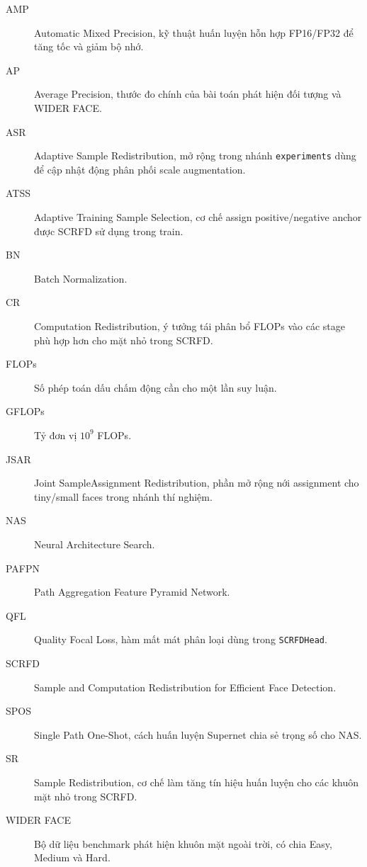 ﻿\begin{description}
  \item[AMP] Automatic Mixed Precision, kỹ thuật huấn luyện hỗn hợp FP16/FP32 để tăng tốc và giảm bộ nhớ.
  \item[AP] Average Precision, thước đo chính của bài toán phát hiện đối tượng và WIDER FACE.
  \item[ASR] Adaptive Sample Redistribution, mở rộng trong nhánh \texttt{experiments} dùng để cập nhật động phân phối scale augmentation.
  \item[ATSS] Adaptive Training Sample Selection, cơ chế assign positive/negative anchor được SCRFD sử dụng trong train.
  \item[BN] Batch Normalization.
  \item[CR] Computation Redistribution, ý tưởng tái phân bổ FLOPs vào các stage phù hợp hơn cho mặt nhỏ trong SCRFD.
  \item[FLOPs] Số phép toán dấu chấm động cần cho một lần suy luận.
  \item[GFLOPs] Tỷ đơn vị \(10^9\) FLOPs.
  \item[JSAR] Joint SampleAssignment Redistribution, phần mở rộng nới assignment cho tiny/small faces trong nhánh thí nghiệm.
  \item[NAS] Neural Architecture Search.
  \item[PAFPN] Path Aggregation Feature Pyramid Network.
  \item[QFL] Quality Focal Loss, hàm mất mát phân loại dùng trong \texttt{SCRFDHead}.
  \item[SCRFD] Sample and Computation Redistribution for Efficient Face Detection. \cite{guo2022scrfd}
  \item[SPOS] Single Path One-Shot, cách huấn luyện Supernet chia sẻ trọng số cho NAS. \cite{guo2020spos}
  \item[SR] Sample Redistribution, cơ chế làm tăng tín hiệu huấn luyện cho các khuôn mặt nhỏ trong SCRFD.
  \item[WIDER FACE] Bộ dữ liệu benchmark phát hiện khuôn mặt ngoài trời, có chia Easy, Medium và Hard. \cite{yang2016widerface}
\end{description}

